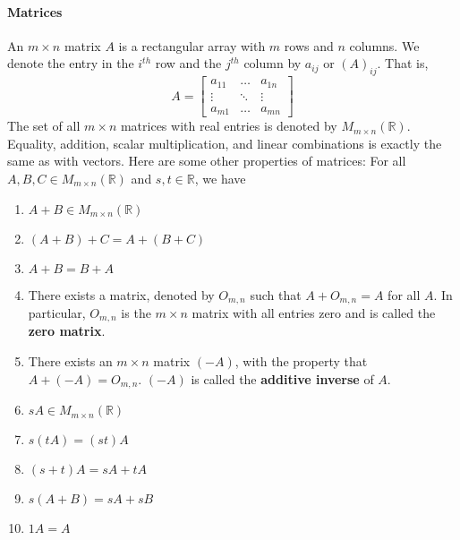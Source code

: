 \documentclass[10pt,letter]{article}
\begin{document}
\paragraph{Matrices} An $m\times n$ matrix $A$ is a rectangular array with $m$ rows and $n$ columns. We denote the entry in the $i^{th}$ row and the $j^{th}$ column by $a_{ij}$ or $(A)_{ij}$. That is, $$A = \begin{bmatrix}a_{11}&\ldots&a_{1n}\\ \vdots &\ddots&\vdots\\a_{m1}&\ldots&a_{mn}\end{bmatrix}$$ The set of all $m\times n$ matrices with real entries is denoted by $M_{m\times n}(\mathbb{R})$. Equality, addition, scalar multiplication, and linear combinations is exactly the same as with vectors. Here are some other properties of matrices: For all $A,B,C\in M_{m\times n}(\mathbb{R})$ and $s,t\in\mathbb{R}$, we have \begin{enumerate}
    \item $A+B\in M_{m\times n}(\mathbb{R})$ 
    \item $(A+B)+C=A+(B+C)$
    \item $A+B=B+A$ 
    \item There exists a matrix, denoted by $O_{m,n}$ such that $A+O_{m,n}=A$ for all $A$. In particular, $O_{m,n}$ is the $m\times n$ matrix with all entries zero and is called the \textbf{zero matrix}. 
    \item There exists an $m\times n$ matrix $(-A)$, with the property that $A+(-A)=O_{m,n}$. $(-A)$ is called the \textbf{additive inverse} of $A$. 
    \item $sA\in M_{m\times n}(\mathbb{R})$ 
    \item $s(tA)=(st)A$ 
    \item $(s+t)A=sA+tA$ 
    \item $s(A+B)=sA+sB$ 
    \item $1A = A$ 
\end{enumerate}
\end{document}
